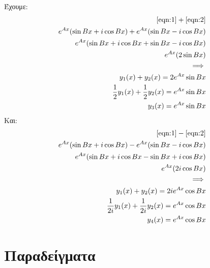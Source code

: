 \documentclass[]{book}
\begin{document}
\begin{multicols*}{2}
Έχουμε:
\begin{equation*}
    \begin{aligned}
        \eqref{eqn:1} + \eqref{eqn:2}                                   \\
        e^{Ax} (\sin{Bx} + i \cos{Bx}) + e^{Ax} (\sin{Bx} - i \cos{Bx}) \\
        e^{Ax} (\sin{Bx} + i \cos{Bx} + \sin{Bx} - i \cos{Bx})          \\
        e^{Ax} (2 \sin{Bx})                                             \\
        \implies                                                        \\
        y_1(x) + y_2(x)                         = 2 e^{Ax} \sin{Bx}     \\
        \frac{1}{2} y_1(x) + \frac{1}{2} y_2(x) = e^{Ax} \sin{Bx}       \\
        y_3(x)                                  = e^{Ax} \sin{Bx}
    \end{aligned}
\end{equation*}
Και:
\begin{equation*}
    \begin{aligned}
        \eqref{eqn:1} - \eqref{eqn:2}                                     \\
        e^{Ax} (\sin{Bx} + i \cos{Bx}) - e^{Ax} (\sin{Bx} - i \cos{Bx})   \\
        e^{Ax} (\sin{Bx} + i \cos{Bx} - \sin{Bx} + i \cos{Bx})            \\
        e^{Ax} (2 i \cos{Bx})                                             \\ \implies                                      \\
        y_1(x) + y_2(x)                             = 2 i e^{Ax} \cos{Bx} \\
        \frac{1}{2 i} y_1(x) + \frac{1}{2 i} y_2(x) = e^{Ax} \cos{Bx}     \\
        y_4(x)                                      = e^{Ax} \cos{Bx}
    \end{aligned}
\end{equation*}
\section{Παραδείγματα}

\end{multicols*}
\end{document}
